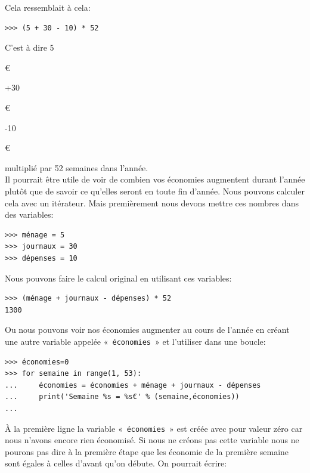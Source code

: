 Cela ressemblait à cela:

\begin{Verbatim}[frame=single,rulecolor=\color{gray}, label=ne pas saisir]
>>> (5 + 30 - 10) * 52
\end{Verbatim}

C'est à dire 5\begin{small}\euro\end{small}+30\begin{small}\euro\end{small}-10\begin{small}\euro\end{small} multiplié par 52 semaines dans l'année.\\

Il pourrait être utile de voir de combien vos économies augmentent durant l'année plutôt que de savoir ce qu'elles seront en toute fin d'année. Nous pouvons calculer cela avec un itérateur. Mais premièrement nous devons mettre ces nombres dans des variables:

\begin{Verbatim}[frame=single,rulecolor=\color{mbleu}, label=à taper]
>>> ménage = 5
>>> journaux = 30
>>> dépenses = 10
\end{Verbatim}

Nous pouvons faire le calcul original en utilisant ces variables:

\begin{Verbatim}[frame=single,rulecolor=\color{mbleu}, label=à taper]
>>> (ménage + journaux - dépenses) * 52
1300
\end{Verbatim}

Ou nous pouvons voir nos économies augmenter au cours de l'année en créant une autre variable appelée «~\texttt{économies}~» et l'utiliser dans une boucle:

\begin{Verbatim}[frame=single,rulecolor=\color{mbleu}, label=à taper]
>>> économies=0
>>> for semaine in range(1, 53):
...     économies = économies + ménage + journaux - dépenses
...     print('Semaine %s = %s€' % (semaine,économies))
... 
\end{Verbatim}

À la première ligne la variable «~\texttt{économies}~» est créée avec pour valeur zéro car nous n'avons encore
rien économisé. Si nous ne créons pas cette variable nous ne pourons pas dire à la première étape que les économie de la première semaine sont égales à celles d'avant qu'on débute. On pourrait écrire:

